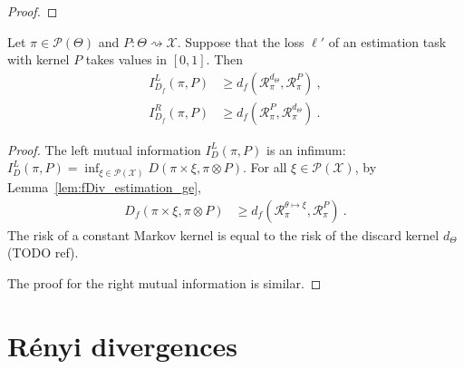 \begin{proof}%
\uses{}

\end{proof}


\begin{lemma}
  \label{lem:mutualInfoLeft_estimation_ge}
  Let $\pi \in \mathcal P(\Theta)$ and $P : \Theta \rightsquigarrow \mathcal X$. Suppose that the loss $\ell'$ of an estimation task with kernel $P$ takes values in $[0,1]$. Then
  \begin{align*}
  I_{D_f}^L(\pi, P)
  &\ge d_f(\mathcal R_\pi^{d_\Theta}, \mathcal R_\pi^P)
  \: , \\
  I_{D_f}^R(\pi, P)
  &\ge d_f(\mathcal R_\pi^P, \mathcal R_\pi^{d_\Theta})
  \: .
  \end{align*}
\end{lemma}

\begin{proof}%
{}
The left mutual information $I_D^L(\pi, P)$ is an infimum: $I_D^L(\pi, P) = \inf_{\xi \in \mathcal P(\mathcal X)} D(\pi \times \xi, \pi \otimes P)$.
For all $\xi \in \mathcal P(\mathcal X)$, by Lemma~\ref{lem:fDiv_estimation_ge},
\begin{align*}
D_f(\pi \times \xi, \pi \otimes P) &\ge d_f(\mathcal R_\pi^{\theta \mapsto \xi}, \mathcal R_\pi^P) \: .
\end{align*}
The risk of a constant Markov kernel is equal to the risk of the discard kernel $d_\Theta$ (TODO ref).

The proof for the right mutual information is similar.
\end{proof}



\section{Rényi divergences}

